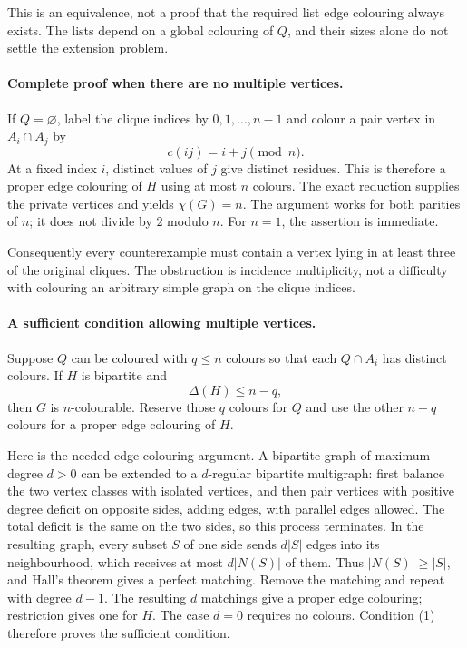This is an equivalence, not a proof that the required list edge colouring always exists. The lists depend on a global colouring of $Q$, and their sizes alone do not settle the extension problem.

\paragraph{Complete proof when there are no multiple vertices.}
If $Q=\varnothing$, label the clique indices by $0,1,\ldots,n-1$ and colour a pair vertex in $A_i\cap A_j$ by
\[
c(ij)=i+j\pmod n.
\]
At a fixed index $i$, distinct values of $j$ give distinct residues. This is therefore a proper edge colouring of $H$ using at most $n$ colours. The exact reduction supplies the private vertices and yields $\chi(G)=n$. The argument works for both parities of $n$; it does not divide by $2$ modulo $n$. For $n=1$, the assertion is immediate.

Consequently every counterexample must contain a vertex lying in at least three of the original cliques. The obstruction is incidence multiplicity, not a difficulty with colouring an arbitrary simple graph on the clique indices.

\paragraph{A sufficient condition allowing multiple vertices.}
Suppose $Q$ can be coloured with $q\le n$ colours so that each $Q\cap A_i$ has distinct colours. If $H$ is bipartite and
\[
\Delta(H)\le n-q,
\tag{1}
\]
then $G$ is $n$-colourable. Reserve those $q$ colours for $Q$ and use the other $n-q$ colours for a proper edge colouring of $H$.

Here is the needed edge-colouring argument. A bipartite graph of maximum degree $d>0$ can be extended to a $d$-regular bipartite multigraph: first balance the two vertex classes with isolated vertices, and then pair vertices with positive degree deficit on opposite sides, adding edges, with parallel edges allowed. The total deficit is the same on the two sides, so this process terminates. In the resulting graph, every subset $S$ of one side sends $d|S|$ edges into its neighbourhood, which receives at most $d|N(S)|$ of them. Thus $|N(S)|\ge|S|$, and Hall's theorem gives a perfect matching. Remove the matching and repeat with degree $d-1$. The resulting $d$ matchings give a proper edge colouring; restriction gives one for $H$. The case $d=0$ requires no colours. Condition (1) therefore proves the sufficient condition.

